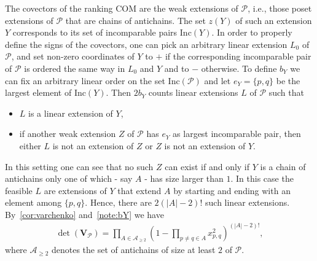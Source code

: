 \documentclass[12pt]{amsart}
\theoremstyle{plain}
\numberwithin{Lemma}{\DefaultNumberTheoremWithin}
\numberwithin{Claim}{\DefaultNumberTheoremWithin}
\numberwithin{Theorem}{\DefaultNumberTheoremWithin}
\numberwithin{Corollary}{\DefaultNumberTheoremWithin}
\numberwithin{Proposition}{\DefaultNumberTheoremWithin}
\numberwithin{Conjecture}{\DefaultNumberTheoremWithin}
\numberwithin{Situation}{\DefaultNumberTheoremWithin}
\numberwithin{Note}{\DefaultNumberTheoremWithin}
\theoremstyle{definition}
\numberwithin{Definition}{\DefaultNumberTheoremWithin}
\theoremstyle{definition}
\numberwithin{Question}{\DefaultNumberTheoremWithin}
\theoremstyle{definition}
\numberwithin{Problem}{\DefaultNumberTheoremWithin}
\theoremstyle{remark} \newtheorem{Remark}{Remark}
\numberwithin{Remark}{\DefaultNumberTheoremWithin}
\theoremstyle{remark}
\numberwithin{Example}{\DefaultNumberTheoremWithin}
\numberwithin{Case}{Lemma}
\numberwithin{Step}{Lemma}
\begin{document}
The covectors of the ranking COM are the weak extensions of $\mathcal{P}$, i.e., those poset extensions of $\mathcal{P}$ that are chains of antichains. The set $z(Y)$ of such an extension $Y$ corresponds to its set of incomparable pairs $\mathrm{Inc}(Y)$. In order to properly define the signs of the covectors, one can pick an arbitrary linear extension $L_0$ of $\mathcal{P}$, and set non-zero coordinates of $Y$ to $+$ if the corresponding incomparable pair of $\mathcal{P}$ is ordered the same way in $L_0$ and $Y$ and to $-$ otherwise. To define $b_Y$ we can fix an arbitrary linear order on the set $\mathrm{Inc}(\mathcal{P})$ and let $e_Y=\{p,q\}$ be the largest element of $\mathrm{Inc}(Y)$. Then $2b_{Y}$ counts linear extensions $L$ of $\mathcal{P}$ such that
\begin{itemize}
 \item $L$ is a linear extension of $Y$,
 \item if another weak extension $Z$ of $\mathcal{P}$ has $e_Y$ as largest incomparable pair, then either $L$ is not an extension of $Z$ or $Z$ is not an extension of $Y$.
\end{itemize}
In this setting one can see that no such $Z$ can exist if and only if $Y$ is a chain of antichains only one of which - say $A$ - has size larger than $1$. In this case the feasible $L$ are extensions of $Y$ that extend $A$ by starting and ending with an element among $\{p,q\}$. Hence, there are $2(|A|-2)!$ such linear extensions. By~\ref{cor:varchenko} and~\ref{note:bY} we have 
  \begin{align*}
     \det (\mathbf{V}_{\mathcal{P}}) = \prod_{A \in \mathcal{A}_{\geq 2}} (1-\prod_{p\neq q\in A}x_{p,q}^2)^{(|A|-2)!},
   \end{align*}
where $\mathcal{A}_{\geq 2}$ denotes the set of antichains of size at least $2$ of $\mathcal{P}$.
\end{document}
